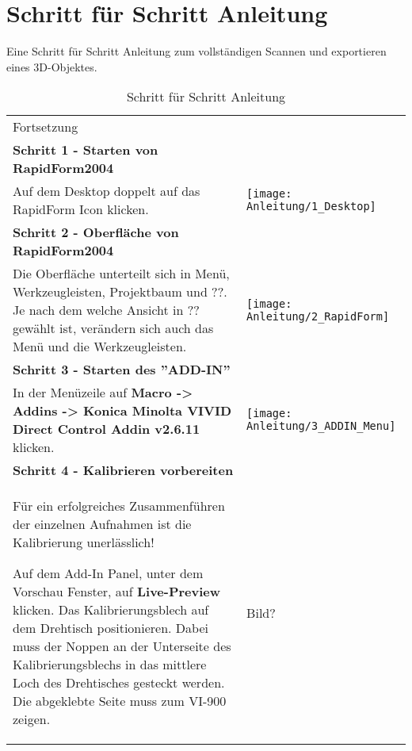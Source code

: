 \section{Schritt für Schritt Anleitung}
\label{sec:StepbyStep}
Eine Schritt für Schritt Anleitung zum vollständigen Scannen und exportieren eines 3D-Objektes.

\begin{longtable}{|>{\RaggedRight}m{5cm}|m{8cm}|} 
\caption{Schritt für Schritt Anleitung} 
\label{tab:StepbyStep}
\\ \hline
\multicolumn{2}{|c|}{\textbf{Schritt für Schritt Anleitung}}
\\ \hline 
\endfirsthead


\multicolumn{2}{|c|}%
{{ Fortsetzung }} 
\\ \hline 
\endhead


\multicolumn{2}{|l|}%
{{\textbf{Schritt 1 - Starten von RapidForm2004}}}
\\ \hline
Auf dem Desktop doppelt auf das RapidForm Icon klicken.
& 
\texttt{[image: Anleitung/1\_Desktop]}
\\ \hline 
 
\multicolumn{2}{|l|}%
{{\textbf{Schritt 2 - Oberfläche von RapidForm2004}}}
\\ \hline
Die Oberfläche unterteilt sich in Menü, Werkzeugleisten, Projektbaum und ??.
Je nach dem welche Ansicht in ?? gewählt ist, verändern sich auch das Menü und die Werkzeugleisten. 
& 
\texttt{[image: Anleitung/2\_RapidForm]}
\\ \hline  

\pagebreak 





\multicolumn{2}{|l|}%
{{\textbf{Schritt 3 - Starten des ''ADD-IN''}}}
\\ \hline
In der Menüzeile auf 
\textbf{Macro -> Addins -> Konica Minolta VIVID Direct Control Addin v2.6.11}
klicken.
& 
\texttt{[image: Anleitung/3\_ADDIN\_Menu]}
\\ \hline  

\multicolumn{2}{|l|}%
{{\textbf{Schritt 4 - Kalibrieren vorbereiten}}}
\\ \hline
\begin{TippS}Für ein erfolgreiches Zusammenführen der einzelnen Aufnahmen ist die Kalibrierung unerlässlich!\end{TippS}
Auf dem Add-In Panel, unter dem Vorschau Fenster, auf \textbf{Live-Preview} klicken. \linebreak
Das Kalibrierungsblech auf dem Drehtisch positionieren.  \linebreak
Dabei muss der Noppen an der Unterseite des Kalibrierungsblechs in das mittlere Loch des Drehtisches gesteckt werden. Die abgeklebte Seite muss zum VI-900 zeigen.
& 
Bild?
\\ \hline  


\end{longtable}
